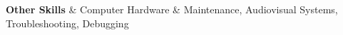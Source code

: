 \textbf{Other Skills} & 
Computer Hardware \& Maintenance, 
Audiovisual Systems, 
Troubleshooting, 
Debugging 
